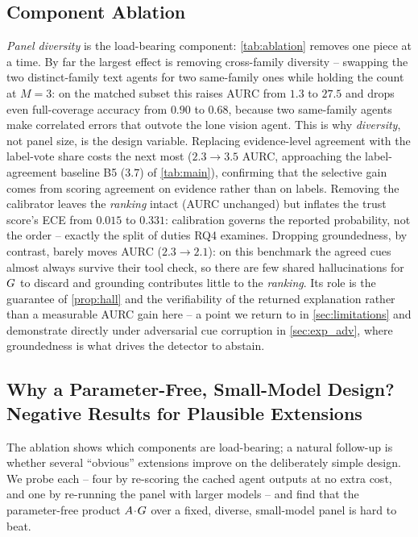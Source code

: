 \subsection{Component Ablation}
\label{sec:exp_rq3}
\emph{Panel diversity} is the load-bearing component: \autoref{tab:ablation} removes one
piece at a time. By far the largest effect is removing cross-family diversity -- swapping
the two distinct-family text agents for two same-family ones while holding the count at
$M{=}3$: on the matched subset this raises AURC from $1.3$ to $27.5$ and drops even
full-coverage accuracy from $0.90$ to $0.68$, because two same-family agents make
correlated errors that outvote the lone vision agent. This is why \emph{diversity}, not
panel size, is the design variable. Replacing evidence-level agreement with the label-vote
share costs the next most ($2.3\to3.5$ AURC, approaching the label-agreement baseline B5
($3.7$) of \autoref{tab:main}), confirming that the selective gain comes from scoring agreement on
evidence rather than on labels. Removing the calibrator leaves the \emph{ranking} intact
(AURC unchanged) but inflates the trust score's ECE from $0.015$ to $0.331$: calibration
governs the reported probability, not the order -- exactly the split of duties RQ4
examines. Dropping groundedness, by contrast, barely moves AURC ($2.3\to2.1$): on this
benchmark the agreed cues almost always survive their tool check, so there are few shared
hallucinations for $G$ to discard and grounding contributes little to the
\emph{ranking}. Its role is the guarantee of \autoref{prop:hall} and the verifiability of
the returned explanation rather than a measurable AURC gain here -- a point we return to
in \autoref{sec:limitations} and demonstrate directly under adversarial cue corruption in
\autoref{sec:exp_adv}, where groundedness is what drives the detector to abstain.


\subsection{Why a Parameter-Free, Small-Model Design? Negative Results for Plausible Extensions}
\label{sec:exp_negatives}
The ablation shows which components are load-bearing; a natural follow-up is whether several
``obvious'' extensions improve on the deliberately simple design. We probe each -- four by
re-scoring the cached agent outputs at no extra cost, and one by re-running the panel with
larger models -- and find that the parameter-free product $A\!\cdot\!G$ over a fixed,
diverse, small-model panel is hard to beat.

